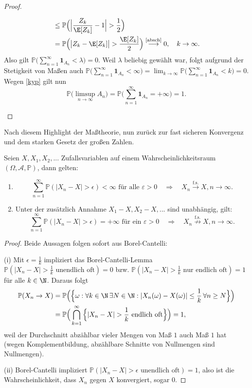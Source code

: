 \begin{proof}
\begin{enumerate}[label=(\roman*)]
\begin{align*}
			& \leq \mathbb{P}\Big(\Big|\frac{Z_k}{\E[Z_k]} - 1\Big| > \frac{1}{2}\Big)\\
		 	&= \mathbb{P}\Big(\big|Z_k - \E[Z_k]\big| > \frac{\E[Z_k]}{2}\Big) \overset{\text{\eqref{absch}}}{\longrightarrow} 0, \quad k \to \infty.
		 \end{align*}
		Also gilt $\mathbb{P}\big(\sum\limits_{n=1}^{\infty} \mathbf{1}_{A_n} < \lambda \big)=0$. Weil $\lambda$ beliebig gew\"ahlt war, folgt aufgrund der Stetigkeit von Ma\ss en auch $\mathbb{P}\big(\sum\limits_{n=1}^{\infty} \mathbf{1}_{A_n} < \infty \big)=\lim_{k\to\infty}\mathbb{P}\big(\sum\limits_{n=1}^{\infty} \mathbf{1}_{A_n} < k \big) =0$.	Wegen \eqref{kyp} gilt nun \[ \mathbb{P}\big(\limsup\limits_{n \to \infty}A_n\big) = \mathbb{P}\Big(\sum\limits_{n=1}^{\infty} \mathbf{1}_{A_n} = +\infty\Big) = 1. \]
	\end{enumerate}
\end{proof}
Nach diesem Highlight der Ma\ss theorie, nun zur\"uck zur fast sicheren Konvergenz und dem starken Gesetz der gro\ss en Zahlen. 
\begin{korollar}\label{ko}
	Seien $X, X_1, X_2, ...$ Zufallsvariablen auf einem Wahrscheinlichkeitsraum $(\Omega, \mathcal A, \mathbb P)$, dann gelten:
	\begin{enumerate}[label=(\roman*)]
		\item $$\sum_{n=1}^\infty \mathbb P(|X_n-X|>\epsilon)<\infty\text{  f\"ur alle }\varepsilon>0 \quad\Longrightarrow\quad X_n\overset{\text{f.s.}}{\to}X, n\to\infty.$$
		\item Unter der zus\"atzlich Annahme $X_1-X, X_2-X, ...$ sind unabh\"angig, gilt: $$\sum_{n=1}^\infty \mathbb P(|X_n-X|>\epsilon)=+\infty\text{ f\"ur ein }\varepsilon>0\quad \Longrightarrow\quad X_n\overset{\text{f.s.}}{\not\to}X, n\to\infty.$$
	\end{enumerate}
\end{korollar}
\begin{proof}
	Beide Aussagen folgen sofort aus Borel-Cantelli:\smallskip
	
	(i) Mit $\epsilon=\frac 1 k$ impliziert das Borel-Cantelli-Lemma $\mathbb P(|X_n-X|>\frac 1 k\text{ unendlich oft})=0$ bzw. $\mathbb P(|X_n-X|>\frac 1 k\text{ nur endlich oft})=1$ f\"ur alle $k\in\N$. Daraus folgt
	\begin{align*}
		\mathbb P(X_n\to X)&=\mathbb P\Big(\Big\{\omega: \forall k \in \N\, \exists N\in \N: |X_n(\omega)-X(\omega)|\leq \frac{1}{k}\, \forall n\geq N\Big\}\Big)\\
		&=\mathbb P\Big( \bigcap_{k=1}^\infty \Big\{ |X_n-X|>\frac{1}{k}\text{ endlich oft}\Big\}\Big)=1,
	\end{align*}
	weil der Durchschnitt abz\"ahlbar vieler Mengen von Ma\ss{} $1$ auch Ma\ss{} $1$ hat (wegen Komplementbildung, abz\"ahlbare Schnitte von Nullmengen sind Nullmengen).\smallskip
	
	(ii) Borel-Cantelli impliziert $\mathbb P(|X_n-X|>\epsilon\text{ unendlich oft})=1$, also ist die Wahrscheinlichkeit, dass $X_n$ gegen $X$ konvergiert, sogar $0$.
\end{proof}

